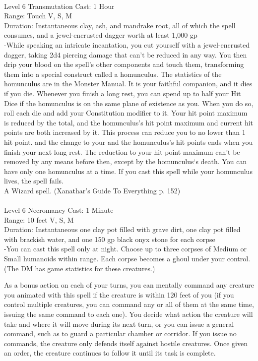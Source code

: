 \documentclass[10pt,twocolumn]{report}
\begin{document}
 \\
Level 6 \quad Transmutation \quad Cast: 1 Hour\\
Range: Touch \quad V, S, M\\
Duration: Instantaneous \quad clay, ash, and mandrake root, all of which the spell consumes, and a jewel-encrusted dagger worth at least 1,000 gp\\
-While speaking an intricate incantation, you cut yourself with a jewel-encrusted dagger, taking 2d4 piercing damage that can’t be reduced in any way. You then drip your blood on the spell’s other components and touch them, transforming them into a special construct called a homunculus. The statistics of the homunculus are in the Monster Manual. It is your faithful companion, and it dies if you die. Whenever you finish a long rest, you can spend up to half your Hit Dice if the homunculus is on the same plane of existence as you. When you do so, roll each die and add your Constitution modifier to it. Your hit point maximum is reduced by the total, and the homunculus’s hit point maximum and current hit points are
both increased by it. This process can reduce you to no lower than 1 hit point. and the change to your and the homunculus’s hit points ends when you finish your next long rest. The reduction to your hit point maximum can’t be removed by any means before then, except by the homunculus‘s death. You can have only one homunculus at a time. If you cast this spell while your homunculus lives, the spell fails.\\
A Wizard spell. (Xanathar's Guide To Everything p. 152) \\


 \\
Level 6 \quad Necromancy \quad Cast: 1 Minute\\
Range: 10 feet \quad V, S, M \\
Duration: Instantaneous \quad one clay pot filled with grave dirt, one clay pot filled with brackish water, and one 150 gp black onyx stone for each corpse\\
-You can cast this spell only at night. Choose up to three corpses of Medium or Small humanoids within range. Each corpse becomes a ghoul under your control. (The DM has game statistics for these creatures.) 

As a bonus action on each of your turns, you can mentally command any creature you animated with this spell if the creature is within 120 feet of you (if you control multiple creatures, you can command any or all of them at the same time, issuing the same command to each one). You decide what action the creature will take and where it will move during its next turn, or you can issue a general command, such as to guard a particular chamber or corridor. If you issue no commands, the creature only defends itself against hostile creatures. Once given an order, the creature continues to follow it until its task is complete. 
\end{document}
